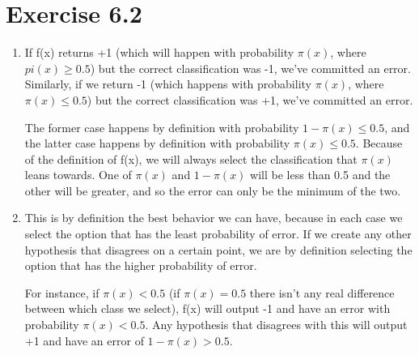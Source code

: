 \documentclass[12pt]{article}
\begin{document}
\section*{Exercise 6.2}
\begin{enumerate}[label=(\alph*)]
	\item If f(x) returns +1 (which will happen with probability $\pi(x)$, where $pi(x) \ge 0.5$) but the correct classification was -1, we've committed an error. Similarly, if we return -1 (which happens with probability $\pi(x)$, where $\pi(x) \le 0.5$) but the correct classification was +1, we've committed an error.
	
	The former case happens by definition with probability $1 - \pi(x) \le 0.5$, and the latter case happens by definition with probability $\pi(x) \le 0.5$. Because of the definition of f(x), we will always select the classification that $\pi(x)$ leans towards. One of $\pi(x)$ and $1 - \pi(x)$ will be less than 0.5 and the other will be greater, and so the error can only be the minimum of the two.
	\item This is by definition the best behavior we can have, because in each case we select the option that has the least probability of error. If we create any other hypothesis that disagrees on a certain point, we are by definition selecting the option that has the higher probability of error.
	
	For instance, if $\pi(x) < 0.5$ (if $\pi(x) = 0.5$ there isn't any real difference between which class we select), f(x) will output -1 and have an error with probability $\pi(x) < 0.5$. Any hypothesis that disagrees with this will output +1 and have an error of $1 - \pi(x) > 0.5$.
\end{enumerate}
\end{document}
